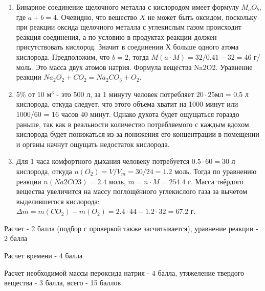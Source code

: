 \solutionSection

\begin{enumerate}
    \item Бинарное соединение щелочного металла с кислородом имеет формулу $M_aO_b$, где $a+b=4$. Очевидно, что 
    вещество $X$ не может быть оксидом, поскольку при реакции оксида щелочного металла с углекислым газом 
    происходит реакция соединения, а по условию в продуктах реакции должен присутствовать кислород. Значит в 
    соединении Х больше одного атома кислорода. Предположим, что $b=2$, тогда $M(a \cdot M) = 32/0.41 - 32 = 46$ 
    г/моль. Это масса двух атомов натрия. Формула вещества Na2O2. Уравнение реакции $Na_2O_2 + CO_2 = Na_2CO_3 + O_2$.
    \item 5\% от 10 м$^3$ - это 500 л, за 1 минуту человек потребляет $20\cdot 25$мл = 0,5 л кислорода, откуда 
    следует, что этого объема хватит на 1000 минут или 1000/60 = 16 часов 40 минут. Однако духота будет ощущаться 
    гораздо раньше, так как в реальности количество потребляемого с каждым вдохом кислорода будет понижаться из-за 
    понижения его концентрации в помещении и органы начнут ощущать недостаток кислорода.
    \item Для 1 часа комфортного дыхания человеку потребуется $0.5 \cdot 60 = 30$ л кислорода, откуда $n(O_2) = V/V_m = 30/24 = 1.2$ моль. Тогда 
    по уравнению реакции $n(Na2CO3) = 2.4$ моль, $m =n \cdot M = 254.4$ г. Масса твёрдого вещества увеличится на 
    массу поглощённого углекислого газа за вычетом выделившегося кислорода: $\Delta m = m(CO_2) - m(O_2) = 2.4 \cdot 44 - 1.2 \cdot 32 = 67.2$ г.
\end{enumerate}

Расчет - 2 балла (подбор с проверкой также засчитывается), уравнение реакции - 2 балла

Расчет времени - 4 балла

Расчет необходимой массы пероксида натрия - 4 балла, утяжеление твердого вещества - 3 балла, всего - 15 баллов

